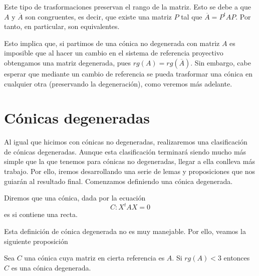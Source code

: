 Este tipo de trasformaciones preservan el rango de la matriz. Esto se debe a que $A$ y $\overline{A}$ son congruentes, es decir, que existe una matriz $P$ tal que $\overline{A}=P^tAP$. Por tanto, en particular, son equivalentes.

Esto implica que, si partimos de una cónica no degenerada con matriz $A$ es imposible que al hacer un cambio en el sistema de referencia proyectivo obtengamos una matriz degenerada, pues $rg(A)=rg(\overline{A})$. Sin embargo, cabe esperar que mediante un cambio de referencia se pueda trasformar una cónica en cualquier otra (preservando la degeneración), como veremos más adelante.

\section{Cónicas degeneradas}
\label{C8_sec_conicas_degeneradas}
Al igual que hicimos con cónicas no degeneradas, realizaremos una clasificación de cónicas degeneradas. Aunque esta clasificación terminará siendo mucho más simple que la que tenemos para cónicas no degeneradas, llegar a ella conlleva más trabajo. Por ello, iremos desarrollando una serie de lemas y proposiciones que nos guiarán al resultado final. Comenzamos definiendo una cónica degenerada.
\begin{defi}
	Diremos que una cónica, dada por la ecuación
	\begin{equation}
	C:X^tAX=0
	\end{equation}
	es  si contiene una recta.
\end{defi}

Esta definición de cónica degenerada no es muy manejable. Por ello, veamos la siguiente proposición
\begin{prop}\label{C8_prop_rango_menor_3_degenerada}
	Sea $C$ una cónica cuya matriz en cierta referencia es $A$. Si $rg(A)<3$ entonces $C$ es una cónica degenerada.
\end{prop}

